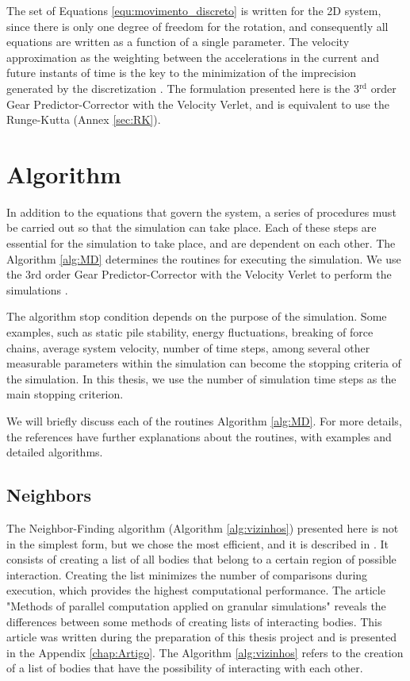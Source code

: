     The set of Equations \ref{equ:movimento_discreto} is written for the 2D system, since there is only one degree of freedom for the rotation, and consequently all equations are written as a function of a single parameter. The velocity approximation as the weighting between the accelerations in the current and future instants of time is the key to the minimization of the imprecision generated by the discretization \cite{Computer_Simulation_of_Liquids}. The formulation presented here is the 3$^\textrm{rd}$ order Gear Predictor-Corrector with the Velocity Verlet, and is equivalent to use the Runge-Kutta (Annex \ref{sec:RK}).

\section{Algorithm}
    In addition to the equations that govern the system, a series of procedures must be carried out so that the simulation can take place. Each of these steps are essential for the simulation to take place, and are dependent on each other. The Algorithm \ref{alg:MD} determines the routines for executing the simulation. We use the 3rd order Gear Predictor-Corrector with the Velocity Verlet to perform the simulations \cite{Computer_Simulation_of_Liquids}.



    The algorithm stop condition depends on the purpose of the simulation. Some examples, such as static pile stability, energy fluctuations, breaking of force chains, average system velocity, number of time steps, among several other measurable parameters within the simulation can become the stopping criteria of the simulation. In this thesis, we use the number of simulation time steps as the main stopping criterion. 

    We will briefly discuss each of the routines Algorithm \ref{alg:MD}. For more details, the references \cite{Dissertacao, Computer_Simulation_of_Liquids, Computational_Granular_Dynamics} have further explanations about the routines, with examples and detailed algorithms. 

\subsection{Neighbors}
    The Neighbor-Finding algorithm (Algorithm \ref{alg:vizinhos}) presented here is not in the simplest form, but we chose the most efficient, and it is described in \cite{Dissertacao}. It consists of creating a list of all bodies that belong to a certain region of possible interaction. Creating the list minimizes the number of comparisons during execution, which provides the highest computational performance. The article "Methods of parallel computation applied on granular simulations" \cite{Methods_of_Parallel_Computation_Applied_on_Granular_Simulations} reveals the differences between some methods of creating lists of interacting bodies. This article was written during the preparation of this thesis project and is presented in the Appendix \ref{chap:Artigo}. The Algorithm \ref{alg:vizinhos} refers to the creation of a list of bodies that have the possibility of interacting with each other.

